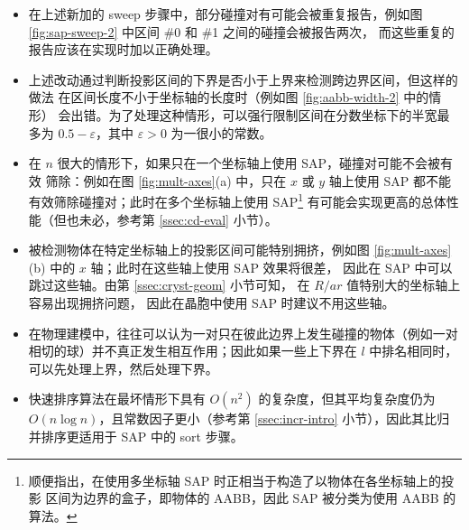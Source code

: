 \begin{itemize}
\item 在上述新加的 sweep 步骤中，部分碰撞对有可能会被重复报告，例如图
	\ref{fig:sap-sweep-2} 中区间 \#0 和 \#1 之间的碰撞会被报告两次，
	而这些重复的报告应该在实现时加以正确处理。
\item 上述改动通过判断投影区间的下界是否小于上界来检测跨边界区间，但这样的做法
	在区间长度不小于坐标轴的长度时（例如图 \ref{fig:aabb-width-2} 中的情形）
	会出错。为了处理这种情形，可以强行限制区间在分数坐标下的半宽最多为
	$0.5 - \varepsilon$，其中 $\varepsilon > 0$ 为一很小的常数。
\item 在 $n$ 很大的情形下，如果只在一个坐标轴上使用 SAP，碰撞对可能不会被有效
	筛除：例如在图 \ref{fig:mult-axes}(a) 中，只在 $x$ 或 $y$ 轴上使用 SAP
	都不能有效筛除碰撞对；此时在多个坐标轴上使用 SAP\footnote{%
		顺便指出，在使用多坐标轴 SAP 时正相当于构造了以物体在各坐标轴上的投影
		区间为边界的盒子，即物体的 AABB，因此 SAP 被分类为使用 AABB 的算法。%
	} 有可能会实现更高的总体性能（但也未必，参考第 \ref{ssec:cd-eval} 小节）。
\item 被检测物体在特定坐标轴上的投影区间可能特别拥挤，例如图
	\ref{fig:mult-axes}(b) 中的 $x$ 轴；此时在这些轴上使用 SAP 效果将很差，
	因此在 SAP 中可以跳过这些轴。由第 \ref{ssec:cryst-geom} 小节可知，
	在 $R/ar$ 值特别大的坐标轴上容易出现拥挤问题，
	因此在晶胞中使用 SAP 时建议不用这些轴。
\item 在物理建模中，往往可以认为一对只在彼此边界上发生碰撞的物体（例如一对
	相切的球）并不真正发生相互作用；因此如果一些上下界在 $l$ 中排名相同时，
	可以先处理上界，然后处理下界。
\item 快速排序算法\parencite[113-122]{knuth1998}在最坏情形下具有 $O(n^2)$
	的复杂度，但其平均复杂度仍为 $O(n\log n)$，且常数因子更小（参考第
	\ref{ssec:incr-intro} 小节），因此其比归并排序更适用于 SAP 中的 sort 步骤。
\end{itemize}

